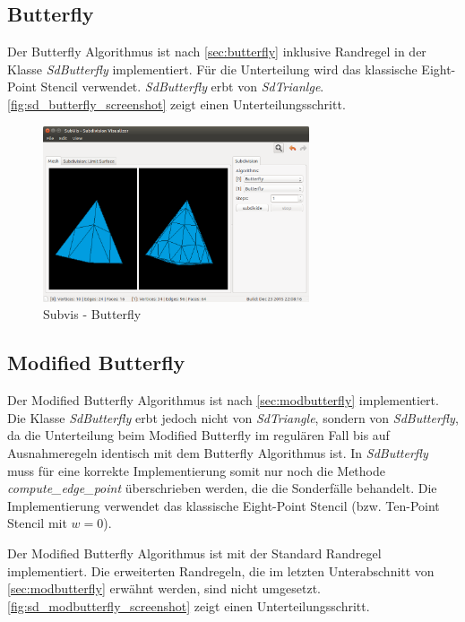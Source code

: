 \subsection{Butterfly}

Der Butterfly Algorithmus ist nach \autoref{sec:butterfly}
inklusive Randregel in der Klasse \emph{SdButterfly} implementiert.
Für die Unterteilung wird das klassische Eight-Point Stencil verwendet.
\emph{SdButterfly} erbt von \emph{SdTrianlge}.
\autoref{fig:sd_butterfly_screenshot} zeigt einen Unterteilungsschritt.

\begin{figure}
  \centering
  \includegraphics[width=0.7\textwidth]{content/media/sd_butterfly_screenshot.png}
  \caption{Subvis - Butterfly}
  \label{fig:sd_butterfly_screenshot}
\end{figure}

\subsection{Modified Butterfly}

Der Modified Butterfly Algorithmus ist nach \autoref{sec:modbutterfly} implementiert.
Die Klasse \emph{SdButterfly} erbt jedoch nicht von \emph{SdTriangle},
sondern von \emph{SdButterfly}, da die Unterteilung
beim Modified Butterfly im regulären Fall bis auf Ausnahmeregeln
identisch mit dem Butterfly Algorithmus ist. In \emph{SdButterfly}
muss für eine korrekte Implementierung somit nur noch die Methode
\emph{compute\_edge\_point} überschrieben werden, die
die Sonderfälle behandelt.
Die Implementierung verwendet das klassische Eight-Point Stencil
(bzw. Ten-Point Stencil mit \(w = 0\)).

Der Modified Butterfly Algorithmus ist mit der Standard Randregel
implementiert.
Die erweiterten Randregeln, die im letzten Unterabschnitt von \autoref{sec:modbutterfly}
erwähnt werden, sind nicht umgesetzt.
\autoref{fig:sd_modbutterfly_screenshot} zeigt einen Unterteilungsschritt.

